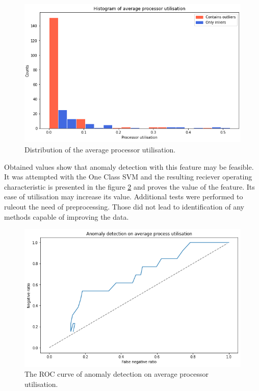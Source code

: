 \documentclass[a4paper,twoside,12pt]{book}
\begin{document}
\begin{figure}
	\centering
	\includegraphics[scale=0.9]{images/HistAvgProcs}
	\caption{Distribution of the average processor utilisation.}
	\label{fig:histavgproc}
 \end{figure}

Obtained values show that anomaly detection with this feature may be feasible. It was attempted with 
the One Class SVM and the resulting reciever operating characteristic is presented in the figure
\ref{fig:procroc} and proves the value of the feature. Its ease of utilisation may increase its value.
Additional tests were performed to ruleout the need of preprocessing. Those did not lead to identification
of any methods capable of improving the data.

\begin{figure}
	\centering
	\includegraphics[scale=0.9]{images/ProcROCKF}
	\caption{The ROC curve of anomaly detection on average processor utilisation.}
	\label{fig:procroc}
 \end{figure}
\end{document}
